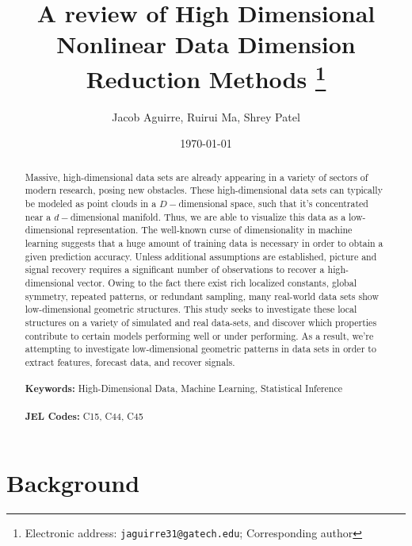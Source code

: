 \documentclass[11pt]{article}
\begin{document}
\begin{titlepage}
\title{A review of High Dimensional Nonlinear Data Dimension Reduction Methods
\thanks{Electronic address: \texttt{jaguirre31@gatech.edu}; Corresponding author}}
\author{Jacob Aguirre, Ruirui Ma, Shrey Patel}
\date{\today}
\maketitle
\begin{abstract}
\noindent Massive, high-dimensional data sets are already appearing in a variety of sectors of modern research, posing new obstacles. These high-dimensional data sets can typically be modeled as point clouds in a $D-$dimensional space, such that it's concentrated near a $d-$dimensional manifold. Thus, we are able to visualize this data as a low-dimensional representation. The well-known curse of dimensionality in machine learning suggests that a huge amount of training data is necessary in order to obtain a given prediction accuracy. Unless additional assumptions are established, picture and signal recovery requires a significant number of observations to recover a high-dimensional vector. Owing to the fact there exist rich localized constants, global symmetry, repeated patterns, or redundant sampling, many real-world data sets show low-dimensional geometric structures. This study seeks to investigate these local structures on a variety of simulated and real data-sets, and discover which properties contribute to certain models performing well or under performing. As a result, we're attempting to investigate low-dimensional geometric patterns in data sets in order to extract features, forecast data, and recover signals.  \\
\vspace{0in}\\
\noindent\textbf{Keywords:} High-Dimensional Data, Machine Learning, Statistical Inference\\
\vspace{0in}\\
\noindent\textbf{JEL Codes:} C15, C44, C45\\

\bigskip
\end{abstract}
\setcounter{page}{0}
\thispagestyle{empty}
\end{titlepage}
\pagebreak \newpage




\doublespacing


\section{Background} \label{sec:introduction}
\end{document}
